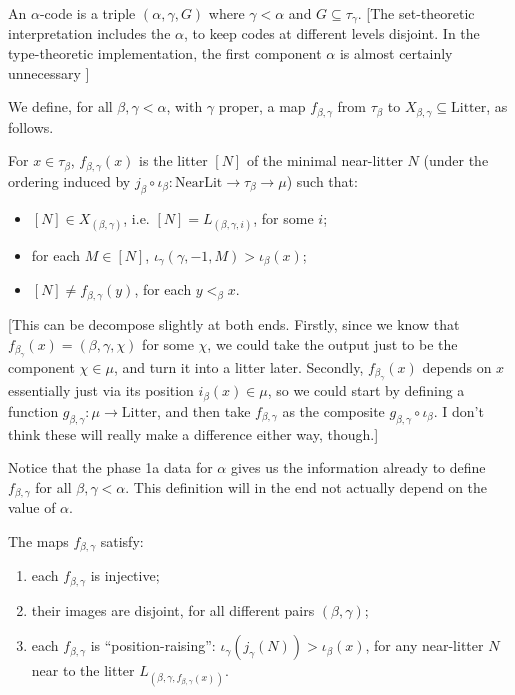 \begin{definition}
\label {def:code}
An $\alpha$-code is a triple $(\alpha,\gamma,G)$ where $\gamma<\alpha$ and $G \subseteq \tau_\gamma$. [The set-theoretic interpretation includes the $\alpha$, to keep codes at different levels disjoint.  In the type-theoretic implementation, the first component $\alpha$ is almost certainly unnecessary ]
\end{definition}

\begin{definition}
\label {def:f-map}
We define, for all $\beta,\gamma < \alpha$, with $\gamma$ proper, a map $f_{\beta,\gamma}$ from $\tau_\beta$ to $X_{\beta,\gamma} \subseteq \mathrm{Litter}$, as follows.

For $x \in \tau_\beta$, $f_{\beta,\gamma}(x)$ is the litter $[N]$ of the minimal near-litter $N$ (under the ordering induced by $j_\beta \circ \iota_\beta : \mathrm{NearLit} \to \tau_\beta \to \mu$) such that:
\begin{itemize}
  \item $[N]\in X_{(\beta,\gamma)}$, i.e. $[N] = L_{(\beta,\gamma,i)}$, for some $i$;
  \item for each $M \in [N]$, $\iota_\gamma(\gamma,-1,M) >\iota_\beta(x)$;
  \item $[N] \neq f_{\beta,\gamma}(y)$, for each $y <_\beta x$.
\end{itemize}

[This can be decompose slightly at both ends.  Firstly, since we know that $f_{\beta_\gamma}(x) = (\beta,\gamma,\chi)$ for some $\chi$, we could take the output just to be the component $\chi \in \mu$, and turn it into a litter later.  Secondly, $f_{\beta_\gamma}(x)$ depends on $x$ essentially just via its position $i_\beta(x) \in \mu$, so we could start by defining a function $g_{\beta,\gamma} : \mu \to \mathrm{Litter}$, and then take $f_{\beta,\gamma}$ as the composite $g_{\beta,\gamma} \circ \iota_\beta$.  I don’t think these will really make a difference either way, though.]
\end{definition}

Notice that the phase 1a data for $\alpha$ gives us the information already to define $f_{\beta,\gamma}$ for all $\beta, \gamma < \alpha$.  This definition will in the end not actually depend on the value of $\alpha$.

\begin{lemma}
  \label{lem:f-map-properties}
  The maps $f_{\beta,\gamma}$ satisfy:
  \begin{enumerate}
  \item each $f_{\beta,\gamma}$ is injective;
  \item their images are disjoint, for all different pairs $(\beta,\gamma)$;
  \item each $f_{\beta,\gamma}$ is “position-raising”: $\iota_\gamma(j_\gamma(N)) > \iota_\beta(x)$, for any near-litter $N$ near to the litter $L_{(\beta,\gamma,f_{\beta,\gamma}(x))}$.
  \end{enumerate}
\end{lemma}


